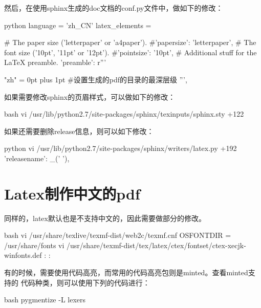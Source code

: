 然后，在使用sphinx生成的doc文档的conf.py文件中，做如下的修改：
\begin{code-block}{python}
language = 'zh_CN'
latex_elements = {
# The paper size ('letterpaper' or 'a4paper').
#'papersize': 'letterpaper',
# The font size ('10pt', '11pt' or '12pt').
#'pointsize': '10pt',
# Additional stuff for the LaTeX preamble.
'preamble': r'''
     \usepackage{xeCJK}
     \XeTeXlinebreaklocale "zh"
     \XeTeXlinebreakskip = 0pt plus 1pt
     \setcounter{tocdepth}{4}  #设置生成的pdf的目录的最深层级
''',
}
\end{code-block}

如果需要修改sphinx的页眉样式，可以做如下的修改：
\begin{code-block}{bash}
vi /usr/lib/python2.7/site-packages/sphinx/texinputs/sphinx.sty +122
\fancyhead[LE,RO]{{\py@HeaderFamily \@title}}
\end{code-block}

如果还需要删除release信息，则可以如下修改：
\begin{code-block}{python}
vi /usr/lib/python2.7/site-packages/sphinx/writers/latex.py +192
'releasename':  _(' '),
\end{code-block}

\section{Latex制作中文的pdf}
同样的，latex默认也是不支持中文的，因此需要做部分的修改。
\begin{code-block}{bash}
vi /usr/share/texlive/texmf-dist/web2c/texmf.cnf
OSFONTDIR = /usr/share/fonts
vi /usr/share/texmf-dist/tex/latex/ctex/fontset/ctex-xecjk-winfonts.def
:%
:%
\end{code-block}

有的时候，需要使用代码高亮，而常用的代码高亮包则是minted。查看minted支持的
代码种类，则可以使用下列的代码进行：
\begin{code-block}{bash}
pygmentize -L lexers
\end{code-block}

